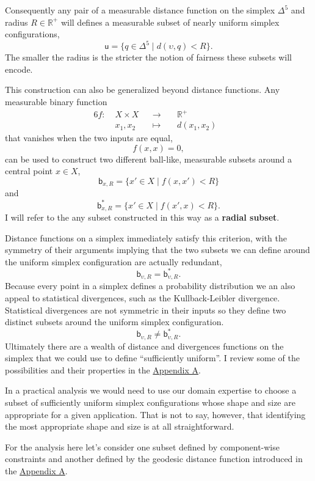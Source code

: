 \documentclass[
  letterpaper,
  DIV=11,
  numbers=noendperiod]{scrartcl}
\begin{document}
Consequently any pair of a measurable distance function on the simplex
\(\Delta^{5}\) and radius \(R \in \mathbb{R}^{+}\) will defines a
measurable subset of nearly uniform simplex configurations, \[
\mathsf{u}
=
\{ q \in \Delta^{5} \mid d(\upsilon, q) < R \}.
\] The smaller the radius is the stricter the notion of fairness these
subsets will encode.

This construction can also be generalized beyond distance functions. Any
measurable binary function \begin{alignat*}{6}
f :\; & X \times X & &\rightarrow& \; & \mathbb{R}^{+} &
\\
& x_{1}, x_{2} & &\mapsto& & d(x_{1}, x_{2}) &
\end{alignat*} that vanishes when the two inputs are equal, \[
f(x, x) = 0,
\] can be used to construct two different ball-like, measurable subsets
around a central point \(x \in X\), \[
\mathsf{b}_{x, R}
=
\{ x' \in X \mid f(x, x') < R \}
\] and \[
\mathsf{b}^{*}_{x, R}
=
\{ x' \in X \mid f(x', x) < R \}.
\] I will refer to the any subset constructed in this way as a
\textbf{radial subset}.

Distance functions on a simplex immediately satisfy this criterion, with
the symmetry of their arguments implying that the two subsets we can
define around the uniform simplex configuration are actually redundant,
\[
\mathsf{b}_{\upsilon, R} = \mathsf{b}^{*}_{\upsilon, R}.
\] Because every point in a simplex defines a probability distribution
we an also appeal to statistical divergences, such as the
Kullback-Leibler divergence. Statistical divergences are not symmetric
in their inputs so they define two distinct subsets around the uniform
simplex configuration. \[
\mathsf{b}_{\upsilon, R} \ne \mathsf{b}^{*}_{\upsilon, R}.
\] Ultimately there are a wealth of distance and divergences functions
on the simplex that we could use to define ``sufficiently uniform''. I
review some of the possibilities and their properties in the
\href{@sec:appendixa}{Appendix A}.

In a practical analysis we would need to use our domain expertise to
choose a subset of sufficiently uniform simplex configurations whose
shape and size are appropriate for a given application. That is not to
say, however, that identifying the most appropriate shape and size is at
all straightforward.

For the analysis here let's consider one subset defined by
component-wise constraints and another defined by the geodesic distance
function introduced in the \href{@sec:appendixa}{Appendix A}.
\end{document}
